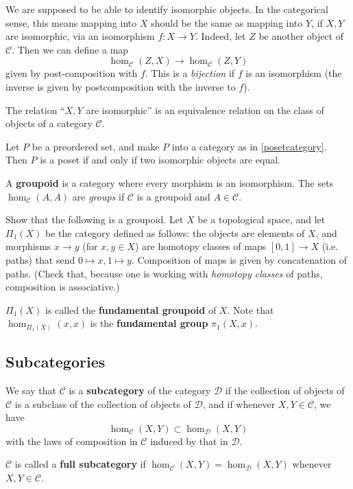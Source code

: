 We are supposed to be able to identify isomorphic objects. In the categorical
sense, this means mapping into $X$ should be the same as mapping into $Y$, if
$X, Y$ are isomorphic, via an isomorphism $f: X \to Y$.
Indeed, let 
$Z$ be another object of $\mathcal{C}$.
Then we can define a map
\[ \hom_{\mathcal{C}}(Z, X) \to \hom_{\mathcal{C}}(Z, Y)  \]
given by post-composition with $f$. This is a \emph{bijection} if $f$ is an
isomorphism (the inverse is given by postcomposition with the inverse to $f$).

\begin{exercise} 
The relation ``$X, Y$ are isomorphic'' is an equivalence relation on the class
of objects of a category $\mathcal{C}$.
\end{exercise} 

\begin{exercise} 
Let $P$ be a preordered set, and make $P$ into a category as in
\cref{posetcategory}. Then $P$ is a poset if and only if two isomorphic objects
are equal.
\end{exercise} 

\begin{exercise} 
A \textbf{groupoid} is a category where every morphism is an isomorphism. The
sets $\hom_{\mathcal{C}}(A, A)$ are \emph{groups} if $\mathcal{C}$ is a
groupoid and $A \in \mathcal{C}$.
\end{exercise}

\begin{exercise}

Show that the following is a groupoid. Let $X$ be a topological space, and let
$\Pi_1(X)$ be the category defined as follows: the objects are elements of $X$,
and morphisms $x \to y$ (for $x,y \in X$) are homotopy classes of maps $[0,1]
\to X$ (i.e. paths) that send $0 \mapsto x, 1 \mapsto y$. Composition of maps
is given by concatenation of paths.
(Check that, because one is working with \emph{homotopy classes} of paths,
composition is associative.)

$\Pi_1(X)$ is called the \textbf{fundamental groupoid} of $X$. Note that
$\hom_{\Pi_1(X)}(x, x)$ is the \textbf{fundamental group} $\pi_1(X, x)$.
\end{exercise} 

\subsection{Subcategories}

\begin{definition} 
We say that $\mathcal{C}$ is a \textbf{subcategory} of the category
$\mathcal{D}$ if the collection of objects of $\mathcal{C}$ is a subclass of
the collection of objects of $\mathcal{D}$, and if whenever
$X, Y \in \mathcal{C}$, we have
\[ \hom_{\mathcal{C}}(X, Y) \subset \hom_{\mathcal{D}}(X, Y)  \]
with the laws of composition in $\mathcal{C}$ induced by that in $\mathcal{D}$.

$\mathcal{C}$ is called a \textbf{full subcategory} if $\hom_{\mathcal{C}}(X,
Y) = \hom_{\mathcal{D}}(X, Y)$ whenever $X, Y \in \mathcal{C}$.
\end{definition} 



